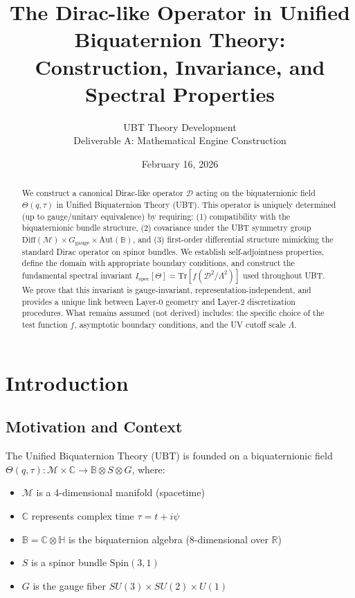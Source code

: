 \documentclass[12pt]{article}
\title{The Dirac-like Operator in Unified Biquaternion Theory:\\
       Construction, Invariance, and Spectral Properties}
\author{UBT Theory Development\\
        \small Deliverable A: Mathematical Engine Construction}
\date{February 16, 2026}
\newcommand{\B}{\mathbb{B}}
\newcommand{\C}{\mathbb{C}}
\newcommand{\R}{\mathbb{R}}
\renewcommand{\H}{\mathbb{H}}
\newcommand{\M}{\mathcal{M}}
\newcommand{\Tr}{\mathrm{Tr}}
\begin{document}
\maketitle

\begin{abstract}
We construct a canonical Dirac-like operator $\mathcal{D}$ acting on the biquaternionic field $\Theta(q,\tau)$ in Unified Biquaternion Theory (UBT). This operator is uniquely determined (up to gauge/unitary equivalence) by requiring: (1) compatibility with the biquaternionic bundle structure, (2) covariance under the UBT symmetry group $\mathrm{Diff}(\M) \times G_{\text{gauge}} \times \mathrm{Aut}(\B)$, and (3) first-order differential structure mimicking the standard Dirac operator on spinor bundles. We establish self-adjointness properties, define the domain with appropriate boundary conditions, and construct the fundamental spectral invariant $I_{\text{spec}}[\Theta] = \Tr[f(\mathcal{D}^2/\Lambda^2)]$ used throughout UBT. We prove that this invariant is gauge-invariant, representation-independent, and provides a unique link between Layer-0 geometry and Layer-2 discretization procedures. What remains assumed (not derived) includes: the specific choice of the test function $f$, asymptotic boundary conditions, and the UV cutoff scale $\Lambda$.
\end{abstract}

\tableofcontents
\newpage

\section{Introduction}

\subsection{Motivation and Context}

The Unified Biquaternion Theory (UBT) is founded on a biquaternionic field $\Theta(q,\tau): \M \times \C \to \B \otimes S \otimes G$, where:
\begin{itemize}
    \item $\M$ is a 4-dimensional manifold (spacetime)
    \item $\C$ represents complex time $\tau = t + i\psi$
    \item $\B = \C \otimes \H$ is the biquaternion algebra (8-dimensional over $\R$)
    \item $S$ is a spinor bundle $\mathrm{Spin}(3,1)$
    \item $G$ is the gauge fiber $SU(3) \times SU(2) \times U(1)$
\end{itemize}
\end{document}
